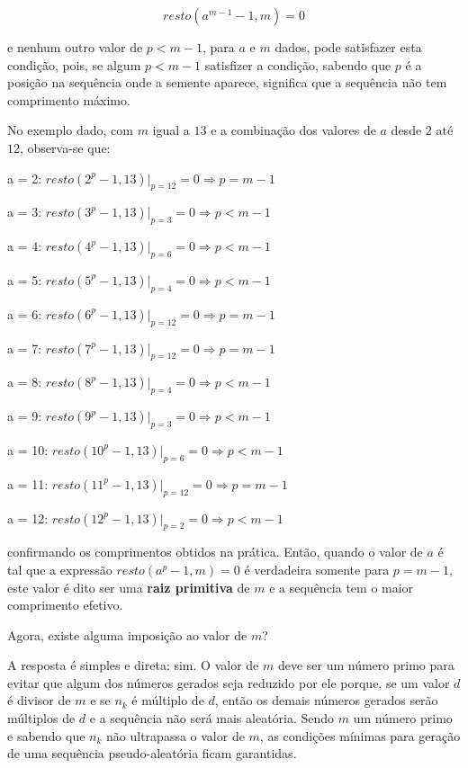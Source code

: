 \documentclass[a4paper,12pt,oneside,onecolumn]{uerj}
\begin{document}
\begin{equation}
resto(a^{m-1}-1,m)=0
\end{equation}

\noindent e nenhum outro valor de $p<m-1$, para $a$ e $m$ dados, pode satisfazer esta condição, pois, se algum $p<m-1$ satisfizer a condição, sabendo que $p$ é a posição na sequência onde a semente aparece, significa que a sequência não tem comprimento máximo. 

No exemplo dado, com $m$ igual a $13$ e a combinação dos valores de $a$ desde $2$ até $12$, observa-se que:

\begin{lcircp}
    \item a = 2: $resto(2^{p}-1,13)\Big\vert_{p=12} = 0 \Rightarrow p = m-1$
    \item a = 3: $resto(3^{p}-1,13)\Big\vert_{p=3} = 0 \Rightarrow p < m-1$
    \item a = 4: $resto(4^{p}-1,13)\Big\vert_{p=6} = 0 \Rightarrow p < m-1$
    \item a = 5: $resto(5^{p}-1,13)\Big\vert_{p=4} = 0 \Rightarrow p < m-1$
    \item a = 6: $resto(6^{p}-1,13)\Big\vert_{p=12} = 0 \Rightarrow p = m-1$
    \item a = 7: $resto(7^{p}-1,13)\Big\vert_{p=12} = 0 \Rightarrow p = m-1$
    \item a = 8: $resto(8^{p}-1,13)\Big\vert_{p=4} = 0 \Rightarrow p < m-1$
    \item a = 9: $resto(9^{p}-1,13)\Big\vert_{p=3} = 0 \Rightarrow p < m-1$
    \item a = 10: $resto(10^{p}-1,13)\Big\vert_{p=6} = 0 \Rightarrow p < m-1$
    \item a = 11: $resto(11^{p}-1,13)\Big\vert_{p=12} = 0 \Rightarrow p = m-1$
    \item a = 12: $resto(12^{p}-1,13)\Big\vert_{p=2} = 0 \Rightarrow p < m-1$\\
\end{lcircp}

\noindent confirmando os comprimentos obtidos na prática. Então, quando o valor de $a$ é tal que a expressão $resto(a^{p}-1,m)=0$ é verdadeira somente para $p=m-1$, este valor é dito ser uma \textbf{raiz primitiva} de $m$ e a sequência tem o maior comprimento efetivo. 

Agora, existe alguma imposição ao valor de $m$?

A resposta é simples e direta: sim. O valor de $m$ deve ser um número primo para evitar que algum dos números gerados seja reduzido por ele porque, se um valor $d$ é divisor de $m$ e se $n_k$ é múltiplo de $d$, então os demais números gerados serão múltiplos de $d$ e a sequência não será mais aleatória. Sendo $m$ um número primo e sabendo que $n_k$ não ultrapassa o valor de $m$, as condições mínimas para geração de uma sequência pseudo-aleatória ficam garantidas.
\end{document}
